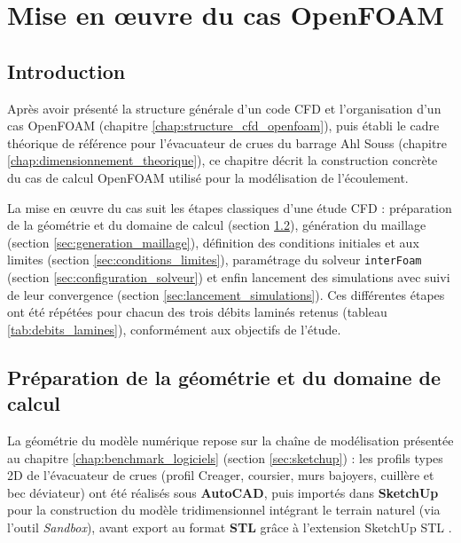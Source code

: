 \chapter{Mise en œuvre du cas OpenFOAM}
\label{chap:mise_en_oeuvre_openfoam}

\section{Introduction}
\label{sec:intro_mise_en_oeuvre}

Après avoir présenté la structure générale d'un code CFD et l'organisation d'un cas OpenFOAM (chapitre \ref{chap:structure_cfd_openfoam}), puis établi le cadre théorique de référence pour l'évacuateur de crues du barrage Ahl Souss (chapitre \ref{chap:dimensionnement_theorique}), ce chapitre décrit la construction concrète du cas de calcul OpenFOAM utilisé pour la modélisation de l'écoulement.

La mise en œuvre du cas suit les étapes classiques d'une étude CFD \cite{greenshields2020openfoam} : préparation de la géométrie et du domaine de calcul (section \ref{sec:preparation_geometrie}), génération du maillage (section \ref{sec:generation_maillage}), définition des conditions initiales et aux limites (section \ref{sec:conditions_limites}), paramétrage du solveur \texttt{interFoam} (section \ref{sec:configuration_solveur}) et enfin lancement des simulations avec suivi de leur convergence (section \ref{sec:lancement_simulations}). Ces différentes étapes ont été répétées pour chacun des trois débits laminés retenus (tableau \ref{tab:debits_lamines}), conformément aux objectifs de l'étude.

\section{Préparation de la géométrie et du domaine de calcul}
\label{sec:preparation_geometrie}

La géométrie du modèle numérique repose sur la chaîne de modélisation présentée au chapitre \ref{chap:benchmark_logiciels} (section \ref{sec:sketchup}) : les profils types 2D de l'évacuateur de crues (profil Creager, coursier, murs bajoyers, cuillère et bec déviateur) ont été réalisés sous \textbf{AutoCAD}, puis importés dans \textbf{SketchUp} pour la construction du modèle tridimensionnel intégrant le terrain naturel (via l'outil \textit{Sandbox}), avant export au format \textbf{STL} grâce à l'extension SketchUp STL \cite{lhuillier2014sketchupstl}.

